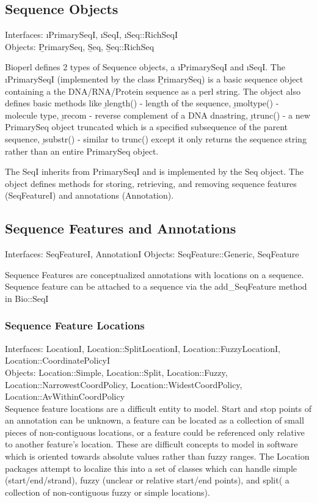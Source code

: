 \documentclass{article}
\begin{document}
\begin{twocolumn}
\subsection{Sequence Objects}
Interfaces: \i{PrimarySeqI}, \i{SeqI}, \i{Seq::RichSeqI}
\\
Objects: \b{PrimarySeq}, \b{Seq}, \b{Seq::RichSeq}

Bioperl defines 2 types of Sequence objects, a \i{PrimarySeqI} and \i{SeqI}.
The \i{PrimarySeqI} (implemented by the class \b{PrimarySeq}) is a basic
sequence object containing a the DNA/RNA/Protein sequence as a perl
string.  The object also defines basic methods like 
\b{\i{length()}} - length of the sequence, 
\b{\i{moltype()}} - molecule type, 
\b{\i{recom}} - reverse complement of a DNA dnastring, 
\b{\i{trunc()}} - a new PrimarySeq object truncated which is 
a specified subsequence of the parent sequence, 
\b{\i{substr()}} - similar to trunc() except it only returns the sequence string rather than an
entire PrimarySeq object.  
\par 
The SeqI inherits from PrimarySeqI and is implemented by the Seq
object.  The object defines methods for storing, retrieving, and
removing sequence features (SeqFeatureI) and annotations (Annotation).

\subsection{Sequence Features and Annotations}

Interfaces: SeqFeatureI, AnnotationI
Objects: SeqFeature::Generic, SeqFeature

Sequence Features are conceptualized annotations with locations on a
sequence.  Sequence feature can be attached to a sequence via the
add_SeqFeature method in Bio::SeqI 

\subsubsection{Sequence Feature Locations}
Interfaces: LocationI, Location::SplitLocationI,
Location::FuzzyLocationI, Location::CoordinatePolicyI
\\
Objects: Location::Simple, Location::Split, Location::Fuzzy,
Location::NarrowestCoordPolicy, Location::WidestCoordPolicy,
Location::AvWithinCoordPolicy
\\
Sequence feature locations are a difficult entity to model.  Start and
stop points of an annotation can be unknown, a feature can be located
as a collection of small pieces of non-contiguous locations, or a
feature could be referenced only relative to another feature's
location.  These are difficult concepts to model in software which is
oriented towards absolute values rather than fuzzy ranges.   The
Location packages attempt to localize this into a set of classes which
can handle simple (start/end/strand), fuzzy (unclear or relative
start/end points), and split( a collection of non-contiguous fuzzy or simple
locations).
  


\end{twocolumn}
\end{document}
